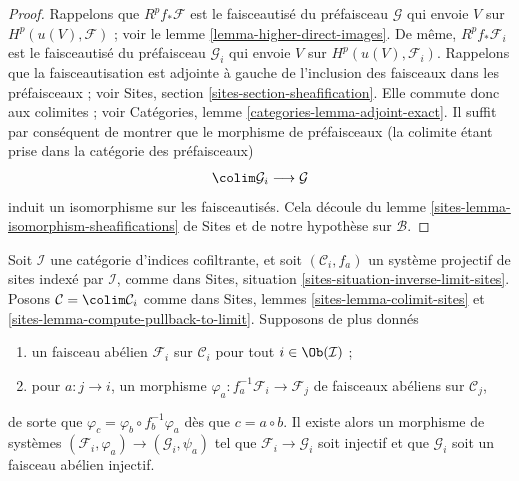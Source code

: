 \begin{proof}
Rappelons que $R^pf_*\mathcal{F}$ est le faisceautisé du préfaisceau
$\mathcal{G}$ qui envoie $V$ sur $H^p(u(V), \mathcal{F})$ ; voir le
lemme \ref{lemma-higher-direct-images}. De même,
$R^pf_*\mathcal{F}_i$ est le faisceautisé du préfaisceau
$\mathcal{G}_i$ qui envoie $V$ sur $H^p(u(V), \mathcal{F}_i)$.
Rappelons que la faisceautisation est adjointe à gauche de l'inclusion des
faisceaux dans les préfaisceaux ; voir Sites, section
\ref{sites-section-sheafification}. Elle commute donc aux colimites ; voir
Catégories, lemme \ref{categories-lemma-adjoint-exact}.
Il suffit par conséquent de montrer que le morphisme de préfaisceaux (la
colimite étant prise dans la catégorie des préfaisceaux)
$$
\colim \mathcal{G}_i \longrightarrow \mathcal{G}
$$
induit un isomorphisme sur les faisceautisés. Cela découle du
lemme \ref{sites-lemma-isomorphism-sheafifications} de Sites et de notre
hypothèse sur $\mathcal{B}$.
\end{proof}

\begin{lemma}
\label{lemma-colim-sites-injective}
Soit $\mathcal{I}$ une catégorie d'indices cofiltrante, et soit
$(\mathcal{C}_i, f_a)$ un système projectif de sites indexé par $\mathcal{I}$,
comme dans Sites, situation \ref{sites-situation-inverse-limit-sites}.
Posons $\mathcal{C} = \colim \mathcal{C}_i$ comme dans Sites, lemmes
\ref{sites-lemma-colimit-sites} et
\ref{sites-lemma-compute-pullback-to-limit}.
Supposons de plus donnés
\begin{enumerate}
\item un faisceau abélien $\mathcal{F}_i$ sur $\mathcal{C}_i$ pour tout
$i \in \Ob(\mathcal{I})$ ;
\item pour $a : j \to i$, un morphisme
$\varphi_a : f_a^{-1}\mathcal{F}_i \to \mathcal{F}_j$
de faisceaux abéliens sur $\mathcal{C}_j$,
\end{enumerate}
de sorte que $\varphi_c = \varphi_b \circ f_b^{-1}\varphi_a$ dès que
$c = a \circ b$. Il existe alors un morphisme de systèmes
$(\mathcal{F}_i, \varphi_a) \to (\mathcal{G}_i, \psi_a)$
tel que $\mathcal{F}_i \to \mathcal{G}_i$ soit injectif et que
$\mathcal{G}_i$ soit un faisceau abélien injectif.
\end{lemma}

